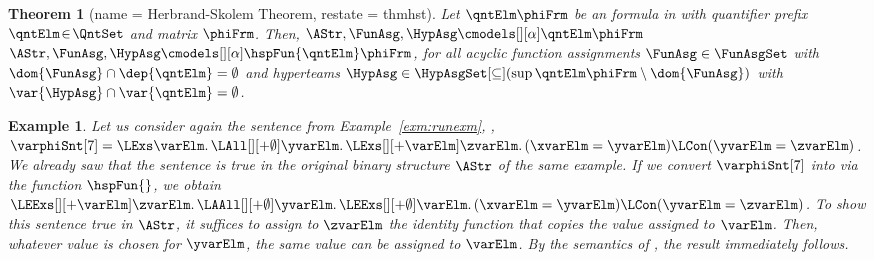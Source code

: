 \documentclass[authoryear]{elsarticle}
\newtheorem{theorem}{Theorem}
\newtheorem{example}{Example}
\begin{document}
\begin{theorem}[name = Herbrand-Skolem Theorem, restate = thmhst]
  \label{thm:hst}
  Let $\qntElm \phiFrm$ be an \ADIF formula in \pnf with quantifier prefix
  $\qntElm \!\in\! \QntSet$ and \FOL matrix $\phiFrm$.
  Then, $\AStr, \FunAsg, \HypAsg \cmodels[][\alpha] \qntElm \phiFrm$ \iff
  $\AStr, \FunAsg, \HypAsg \cmodels[][\alpha] \hspFun{\qntElm} \phiFrm$, for
  all acyclic function assignments $\FunAsg \in \FunAsgSet$ with $\dom{\FunAsg}
  \cap \dep{\qntElm} = \emptyset$ and hyperteams $\HypAsg \in
  \HypAsgSet[\subseteq](\sup{\qntElm \phiFrm} \setminus \dom{\FunAsg})$ with
  $\var{\HypAsg} \cap \var{\qntElm} = \emptyset$.
\end{theorem}

\begin{example}
  \label{exm:runexmmet}
  Let us consider again the sentence from Example~\ref{exm:runexm}, \ie,
  $\varphiSnt[7] = \LExs \varElm \ldotp \LAll[][+\emptyset] \yvarElm \ldotp
  \LExs[][+\varElm] \zvarElm \ldotp (\xvarElm = \yvarElm) \LCon (\yvarElm =
  \zvarElm)$.
  We already saw that the sentence is true in the original binary structure
  $\AStr$ of the same example.
  If we convert $\varphiSnt[7]$ into \Meta via the function $\hspFun{}$, we
  obtain $\LEExs[][+\varElm] \zvarElm \ldotp \LAAll[][+\emptyset] \yvarElm
  \ldotp \LEExs[][+\emptyset] \varElm \ldotp (\xvarElm = \yvarElm) \LCon
  (\yvarElm = \zvarElm)$.
  To show this sentence true in $\AStr$, it suffices to assign to $\zvarElm$ the
  identity function that copies the value assigned to $\varElm$.
  Then, whatever value is chosen for $\yvarElm$, the same value can be assigned
  to $\varElm$.
  By the semantics of \Meta, the result immediately follows.
\end{example}
\end{document}

